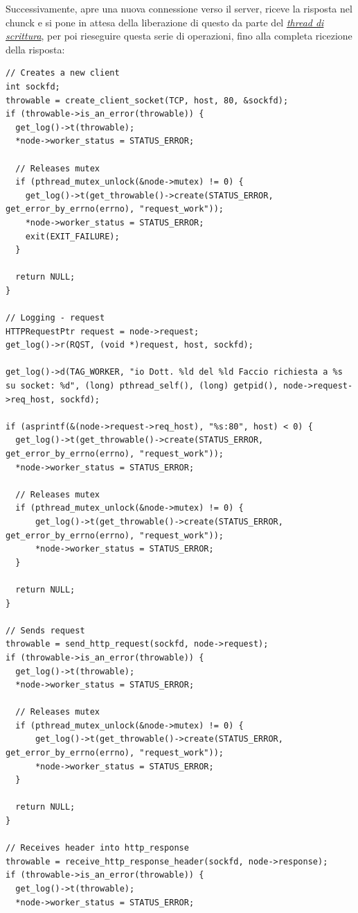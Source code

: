 \documentclass[italian]{tktltiki2}
\begin{document}
Successivamente, apre una nuova connessione verso il server, riceve la risposta nel chunck e si pone in attesa della liberazione di questo da parte del \hyperref[sec:writer]{\emph{thread di scrittura}}, per poi rieseguire questa serie di operazioni, fino alla completa ricezione della risposta:
\begin{lstlisting}
// Creates a new client
int sockfd;
throwable = create_client_socket(TCP, host, 80, &sockfd);
if (throwable->is_an_error(throwable)) {
  get_log()->t(throwable);
  *node->worker_status = STATUS_ERROR;
      
  // Releases mutex
  if (pthread_mutex_unlock(&node->mutex) != 0) {
    get_log()->t(get_throwable()->create(STATUS_ERROR, get_error_by_errno(errno), "request_work"));
    *node->worker_status = STATUS_ERROR;
    exit(EXIT_FAILURE);
  }

  return NULL;
}

// Logging - request
HTTPRequestPtr request = node->request;
get_log()->r(RQST, (void *)request, host, sockfd);

get_log()->d(TAG_WORKER, "io Dott. %ld del %ld Faccio richiesta a %s su socket: %d", (long) pthread_self(), (long) getpid(), node->request->req_host, sockfd);

if (asprintf(&(node->request->req_host), "%s:80", host) < 0) {
  get_log()->t(get_throwable()->create(STATUS_ERROR, get_error_by_errno(errno), "request_work"));
  *node->worker_status = STATUS_ERROR;
  
  // Releases mutex
  if (pthread_mutex_unlock(&node->mutex) != 0) {
      get_log()->t(get_throwable()->create(STATUS_ERROR, get_error_by_errno(errno), "request_work"));
      *node->worker_status = STATUS_ERROR;
  }

  return NULL;
}

// Sends request
throwable = send_http_request(sockfd, node->request);
if (throwable->is_an_error(throwable)) {
  get_log()->t(throwable);
  *node->worker_status = STATUS_ERROR;

  // Releases mutex
  if (pthread_mutex_unlock(&node->mutex) != 0) {
      get_log()->t(get_throwable()->create(STATUS_ERROR, get_error_by_errno(errno), "request_work"));
      *node->worker_status = STATUS_ERROR;
  }

  return NULL;
}

// Receives header into http_response
throwable = receive_http_response_header(sockfd, node->response);
if (throwable->is_an_error(throwable)) {
  get_log()->t(throwable);
  *node->worker_status = STATUS_ERROR;
  

\end{lstlisting}
\end{document}
